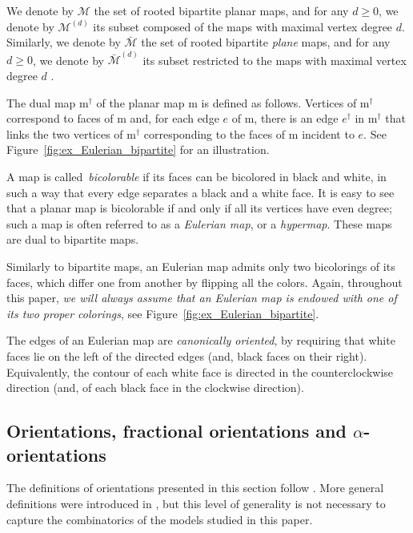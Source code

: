 \documentclass[11pt,reqno,tbtags]{amsart}
\renewcommand{\rm}{\mathrm{m}}
\numberwithin{equation}{section}
\numberwithin{theo}{section}
\theoremstyle{definition}
\begin{document}
We denote by $\mathcal{M}$ the set of rooted bipartite planar maps, and for any $d\geq 0$, we denote by $\mathcal{M}^{(d)}$ its subset composed of the maps with maximal vertex degree $d$. Similarly, we denote by $\bar{\mathcal{M}}$ the set of rooted bipartite \emph{plane} maps, and for any $d\geq 0$, we denote by $\bar{\mathcal{M}}^{(d)}$ its subset restricted to the maps with maximal vertex degree $d$ . 
\smallskip


The dual map $\rm^\dagger$ of the planar map $\rm$ is defined as follows. Vertices of $\rm^\dagger$ correspond to faces of $\rm$ and, for each edge $e$ of $\rm$, there is an edge $e^\dagger$ in $\rm^\dagger$ that links the two vertices of $\rm^\dagger$ corresponding to the faces of $\rm$ incident to $e$. See Figure~\ref{fig:ex_Eulerian_bipartite} for an illustration.

A map is called~\emph{bicolorable} if its faces can be bicolored in black and white, in such a way that every edge separates a black and a white face. It is easy to see that a planar map is bicolorable if and only if all its vertices have even degree; such a map is often referred to as a \emph{Eulerian map}, or a \emph{hypermap}. These maps are dual to bipartite maps.

Similarly to bipartite maps, an Eulerian map admits only two bicolorings of its faces, which differ one from another by flipping all the colors. Again, throughout this paper, \emph{we will always assume that an Eulerian map is endowed with one of its two proper colorings}, see Figure~\ref{fig:ex_Eulerian_bipartite}.

The edges of an Eulerian map are \emph{canonically oriented}, by requiring that white faces lie on the left of the directed edges (and, black faces on their right). Equivalently, the contour of each white face is directed in the counterclockwise direction (and, of each black face in the clockwise direction).





\subsection{Orientations, fractional orientations and \texorpdfstring{$\alpha$}{alpha}-orientations}
		
The definitions of orientations presented in this section follow \cite{Felsner04,BernardiFusy_Girth}. More general definitions were introduced in \cite{BernardiFusy_Girth,BernardiFusy_Boundaries,BernardiFusy_TrigQuadPent}, but this level of generality is not necessary to capture the combinatorics of the models studied in this paper.
				
\end{document}
